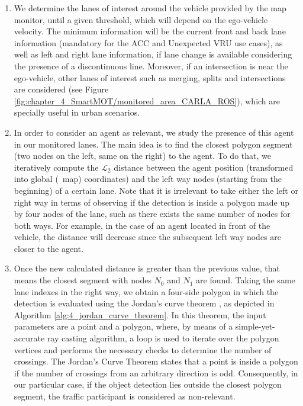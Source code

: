 \begin{enumerate}
	
	\item We determine the lanes of interest around the vehicle provided by the map monitor, until a given threshold, which will depend on the ego-vehicle velocity. The minimum information will be the current front and back lane information (mandatory for the \ac{ACC} and Unexpected \ac{VRU} use cases), as well as left and right lane information, if lane change is available considering the presence of a discontinuous line. Moreover, if an intersection is near the ego-vehicle, other lanes of interest such as merging, splits and intersections are considered (see Figure \ref{fig:chapter_4_SmartMOT/monitored_area_CARLA_ROS}), which are specially useful in urban scenarios.%
	
	\item In order to consider an agent as relevant, we study the presence of this agent in our monitored lanes. The main idea is to find the closest polygon segment (two nodes on the left, same on the right) to the agent. To do that, we iteratively compute the $\mathcal{L}_2$ distance between the agent position (transformed into global (\aka \ map) coordinates) and the left way nodes (starting from the beginning) of a certain lane. Note that it is irrelevant to take either the left or right way in terms of observing if the detection is inside a polygon made up by four nodes of the lane, such as there exists the same number of nodes for both ways. For example, in the case of an agent located in front of the vehicle, the distance will decrease since the subsequent left way nodes are closer to the agent. 
	
	\item Once the new calculated distance is greater than the previous value, that means the closest segment with nodes \textit{$N_0$} and \textit{$N_1$} are found. Taking the same lane indexes in the right way, we obtain a four-side polygon in which the detection is evaluated using the Jordan's curve theorem \cite{tverberg1980proof}, as depicted in Algorithm \ref{alg:4_jordan_curve_theorem}. In this theorem, the input parameters are a point and a polygon, where, by means of a simple-yet-accurate ray casting algorithm, a loop is used to iterate over the polygon vertices and performs the necessary checks to determine the number of crossings. The Jordan's Curve Theorem states that a point is inside a polygon if the number of crossings from an arbitrary direction is odd. Consequently, in our particular case, if the object detection lies outside the closest polygon segment, the traffic participant is considered as non-relevant.
	

\end{enumerate}
